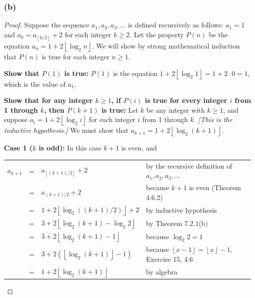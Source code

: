 \documentclass[14pt]{extarticle}
\newcommand{\cy}{\color{cyan}}
\newcommand{\floor}[1]{{\left\lfloor#1\right\rfloor}}
\begin{document}
\subsubsection{(b)}
\begin{proof}
    Suppose the sequence \(a_1, a_2, a_3, \ldots\) is defined recursively as follows: \(a_1 = 1\) and \(a_k =
    a_{\floor{k/2}} + 2\) for each integer \(k \geq 2\). Let the property \(P(n)\) be the equation \(a_n = 1 + 2
    \floor{\log_2 n}\). We will show by strong mathematical induction that \(P(n)\) is true for each integer \(n \geq 1\).

        {\bf Show that \(P(1)\) is true:} \(P(1)\) is the equation \(1 + 2 \floor{\log_2 1} = 1 + 2 \cdot 0 = 1\), which is the value
    of \(a_1\).

        {\bf Show that for any integer \(k \geq 1\), if \(P(i)\) is true for every integer \(i\) from 1 through \(k\), then
            \(P(k + 1)\) is true:} Let \(k\) be any integer with \(k \geq 1\), and suppose \(a_i = 1 + 2 \floor{\log_2 i}\) for each
    integer \(i\) from 1 through \(k\). {\it [This is the inductive hypothesis.]} We must show that \(a_{k+1} = 1 + 2
    \floor{\log_2 (k + 1)}\).

        {\bf Case 1 (\(k\) is odd):} In this case \(k + 1\) is even, and

    \begin{tabular}{rcll}
        \(a_{k+1}\) & = & \(a_{\floor{(k+1)/2}} + 2\)               & {\cy by the recursive definition of \(a_1, a_2, a_3, \ldots\)} \\
                    & = & \(a_{(k+1)/2} + 2\)                       & {\cy because \(k + 1\) is even (Theorem 4.6.2)}                \\
                    & = & \(1 + 2\floor{\log_2((k + 1)/2)} + 2\)    & {\cy by inductive hypothesis}                                  \\
                    & = & \(3 + 2\floor{\log_2(k + 1) - \log_2 2}\) & {\cy by Theorem 7.2.1(b)}                                      \\
                    & = & \(3 + 2\floor{\log_2(k + 1) - 1}\)        & {\cy because \(\log_2 2 = 1\)}                                 \\
                    & = & \(3 + 2(\floor{\log_2(k + 1)} - 1)\)      & {\cy because \(\floor{x-1} = \floor{x}-1\), Exercise 15, 4.6}  \\
                    & = & \(1 + 2\floor{\log_2(k + 1)}\)            & {\cy by algebra}                                               \\
    \end{tabular}


\end{proof}
\end{document}
